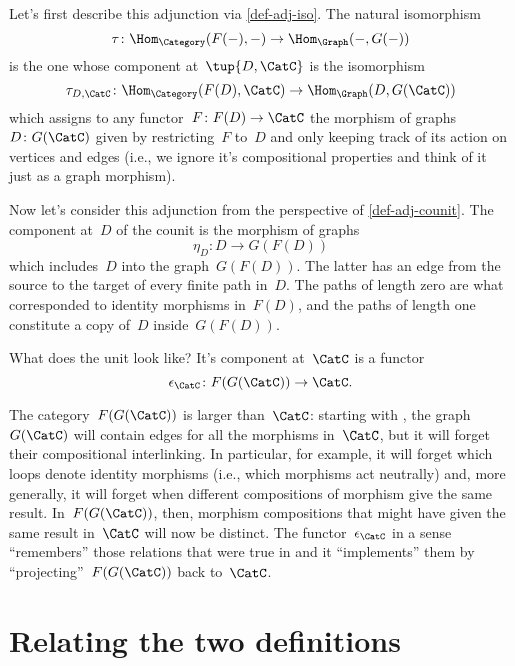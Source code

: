 Let's first describe this adjunction via \cref{def-adj-iso}. The natural isomorphism 
\begin{equation*}
    \tau\colon \Hom_{\Category}(F(- ), - ) \to \Hom_{\Graph}(- , G( - ))
\end{equation*}
is the one whose component at~$\tup{D,\CatC}$ is the isomorphism 
\begin{equation*}
\tau_{D,\CatC} \colon \Hom_{\Category}(F(D), \CatC) \to \Hom_{\Graph}(D, G(\CatC))
\end{equation*}
which assigns to any functor~$F\colon F(D) \to \CatC$ the morphism of graphs~$D \colon G(\CatC)$ given by restricting~$F$ to~$D$ and only keeping track of its action on vertices and edges (i.e., we ignore it's compositional properties and think of it just as a graph morphism).  

Now let's consider this adjunction from the perspective of \cref{def-adj-counit}. The component at~$D$ of the counit is the morphism of graphs 
\begin{equation*}
\eta_D \colon D \to  G(F(D))
\end{equation*}
which includes~$D$ into the graph~$G(F(D))$. The latter has an edge from the source to the target of every finite path in~$D$. The paths of length zero are what corresponded to identity morphisms in~$F(D)$, and the paths of length one constitute a copy of~$D$ inside~$G(F(D))$. 

What does the unit look like? It's component at~$\CatC$ is a functor
\begin{equation*}
\epsilon_{\CatC} \colon F(G(\CatC)) \to \CatC. 
\end{equation*}

The category~$F(G(\CatC))$ is larger than~$\CatC$: starting with \CatC, the graph~$G(\CatC)$ will contain edges for all the morphisms in~$\CatC$, but it will forget their compositional interlinking. In particular, for example, it will forget which loops denote identity morphisms (i.e., which morphisms act neutrally) and, more generally, it will forget when different compositions of morphism give the same result. In~$F(G(\CatC))$, then, morphism compositions that might have given the same result in~$\CatC$ will now be distinct. 
The functor~$\epsilon_{\CatC}$ in a sense ``remembers'' those relations that were true in \CatC and it ``implements'' them by ``projecting''~$F(G(\CatC))$ back to~$\CatC$. 
 
\section{Relating the two definitions}
\label{relate-adj-defs}

